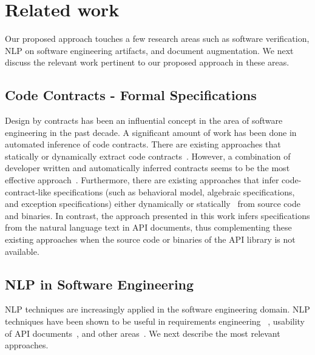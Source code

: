 \section{Related work}
\label{sec:related}


Our proposed approach touches a few research areas such as software verification,
NLP on software engineering artifacts, and document augmentation.
We next discuss the relevant work pertinent to our proposed approach in these areas.

\subsection{Code Contracts - Formal Specifications}
Design by contracts has been an influential concept in the area of software engineering in the past decade.
A significant amount of work has been done in automated inference of code contracts.
There are existing approaches that statically or dynamically extract code contracts~\cite{csallner08dysy,NimmerE02:ISSTA,Tillmann:2006:DLM:2105385.2105433}. However, a combination of developer written and automatically inferred contracts seems to be the most effective approach~\cite{Polikarpova2009ISSTA,Flanagan:2001:HAA:647540.730008}.
Furthermore, there are existing approaches that infer code-contract-like specifications
(such as behavioral model, algebraic specifications, and exception specifications) either dynamically\cite{Henkel07discoveringdocumentation,Ghezzi:2009:SIB:1555001.1555057,Henkel:2008:DDA:1363102.1363105} or statically~\cite{Flanagan:2001:HAA:647540.730008,Buse:2008:ADI:1390630.1390664} from source code and binaries.
In contrast, the approach presented in this work infers specifications from the natural language text in API documents,
thus complementing these existing approaches when the source code or binaries of the API library is not available.


\subsection{NLP in Software Engineering}

NLP techniques are increasingly applied in the software engineering domain. 
NLP techniques have been shown to be useful in requirements engineering ~\cite{Sinha2009,Sinha2010,Gervasi2005},
usability of API documents~\cite{Dekel2009}, and other areas~\cite{Zhou2008,Little2009,pandita13:WHYPER}.
We next describe the most relevant approaches.


